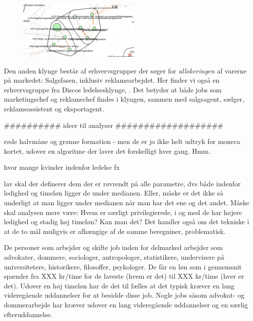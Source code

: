 % 
\begin{figure}
  \vspace{-20pt}
  \begin{center}
    \includegraphics[width=6cm]{fig/segzoom/seg_3_33_ledighed.pdf}
   \caption{}
   \label{fig delanalyse2 zoom seg3.33 ledighed}
  \end{center}
  \vspace{-20pt}
\end{figure}
%

Den anden klynge består af erhvervsgrupper der søger for \emph{allokeringen} af varerne på markedet: Salgsfasen, inklusiv reklamearbejdet. Her finder vi også en erhvervsgruppe fra Discos ledelsesklynge, . Det betyder at både jobs som marketingschef og reklamechef findes i klyngen, sammen med  salgsagent, sælger, reklameassistent og eksportagent. 






\iffalse


########## ideer til analyser ###################

røde halvmåne og grønne formation - men de er jo ikke helt udtryk for moneca kortet, udover en algoritme der laver det forskelligt hver gang. Hmm. 

hvor mange kvinder indenfor ledelse fx 


lav skal der definerer dem der er røvrendt på alle parametre, dvs både indenfor ledighed og timeløn ligger de under medianen. Eller, måske er det ikke så underligt at man ligger under medianen når man har det ene og det andet. Måske skal analysen mere være: Hvem er særligt privilegierede, i og med de har højere ledighed og stadig høj timeløn? Kan man det? Det handler også om det tekniske i at de to mål muligvis er afhængige af de samme beregniner, problematisk. 


De personer som arbejder og skifte job inden for delmarked  arbejder som advokater, dommere, sociologer, antropologer, statistikere, undervisere på universitetere, historikere, filosoffer, psykologer. De får en løn som i gennemsnit spænder fra XXX kr/time for de laveste (hvem er det) til XXX kr/time (hver er det). Udover en høj timeløn har de det til fælles at det typisk kræver en lang videregående uddannelser for at besidde disse job. Nogle jobs såsom advokat- og dommerarbejde har kræver udover en lang videregående uddannelser og en særlig efteruddannelse.

